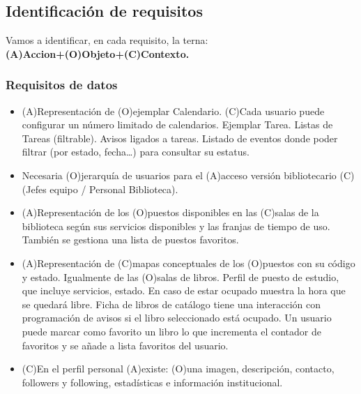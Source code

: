 \documentclass[12pt]{article}
\begin{document}
\subsection{Identificación de requisitos}

Vamos a identificar, en cada requisito, la terna:\\ \textbf{(A)Accion+(O)Objeto+(C)Contexto.}

\subsubsection{Requisitos de datos}
\begin{itemize}[noitemsep] 
\item (A)Representación de (O)ejemplar Calendario. (C)Cada usuario puede configurar un número limitado de calendarios. 
\subitem Ejemplar Tarea.
\subitem Listas de Tareas (filtrable).
\subitem Avisos ligados a tareas.
\subitem Listado de eventos donde poder filtrar (por estado, fecha…) para consultar su estatus. 
\item Necesaria (O)jerarquía de usuarios para el (A)acceso versión bibliotecario (C)(Jefes equipo / Personal Biblioteca).
\item (A)Representación de los (O)puestos disponibles en las (C)salas de la biblioteca según sus servicios disponibles y las franjas de tiempo de uso. 
\subitem También se gestiona una lista de puestos favoritos.
\item (A)Representación de (C)mapas conceptuales de los (O)puestos con su código y estado. Igualmente de las (O)salas de libros.
\subitem Perfil de puesto de estudio, que incluye servicios, estado. En caso de estar ocupado muestra la hora que se quedará libre.
\subitem Ficha de libros de catálogo tiene una interacción con programación de avisos si el libro seleccionado está ocupado. 
\subsubitem Un usuario puede marcar como favorito un libro lo que incrementa el contador de favoritos y se añade a lista favoritos del usuario.
\item (C)En el perfil personal (A)existe: (O)una imagen, descripción, contacto, followers y following, estadísticas e información institucional.
\end{itemize}
\end{document}
